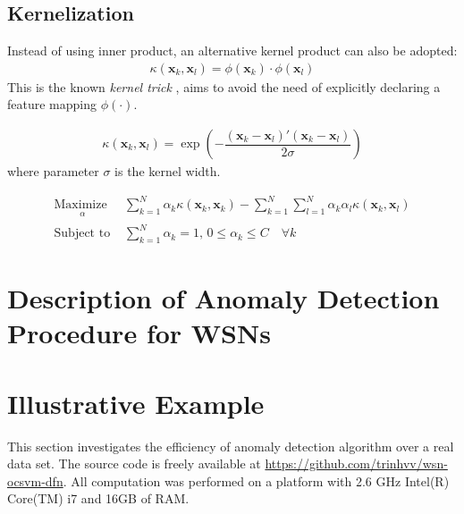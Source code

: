 \documentclass[conference]{IEEEtran}
\theoremstyle{problemstyle}
\begin{document}
\subsection{Kernelization}

Instead of using inner product, an alternative kernel product can also be adopted:
\begin{align}
\kappa \left( \mathbf{x}_k, \mathbf{x}_l \right) = \phi \left( \mathbf{x}_k \right) \cdot \phi \left( \mathbf{x}_l \right)
\end{align}
This is the known \emph{kernel trick} \cite{Scholkopf2001}, aims to avoid the need of explicitly declaring a feature mapping $\phi \left( \cdot \right)$. 

\begin{align}
\kappa \left( \mathbf{x}_k, \mathbf{x}_l \right) = \exp \left( -\dfrac{ \left( \mathbf{x}_k - \mathbf{x}_l \right)'\left( \mathbf{x}_k - \mathbf{x}_l \right) }{2\sigma} \right)
\end{align}
where parameter $\sigma$ is the kernel width. 

\begin{subequations}\label{eq:svm_dual_kernel}
\begin{align}
\underset{
	\begin{array}{c}
		 \alpha
	\end{array}}{\text{Maximize }} &\sum_{k=1}^N \alpha_k \kappa \left( \mathbf{x}_k, \mathbf{x}_k \right)  - \sum_{k=1}^N \sum_{l=1}^N \alpha_k \alpha_l \kappa \left( \mathbf{x}_k, \mathbf{x}_l \right)  \\
\text{Subject to } &\sum_{k=1}^N \alpha_k = 1 \text{, } 0 \le \alpha_k \le C \quad \forall k
\end{align}
\end{subequations}

\section{Description of Anomaly Detection Procedure for WSNs}



\section{Illustrative Example}\label{sec:Illustrative}

This section investigates the efficiency of anomaly detection algorithm over a real data set. The source code is freely available at \url{https://github.com/trinhvv/wsn-ocsvm-dfn}. All computation was performed on a platform with 2.6 GHz Intel(R) Core(TM) i7 and 16GB of RAM.



\end{document}
